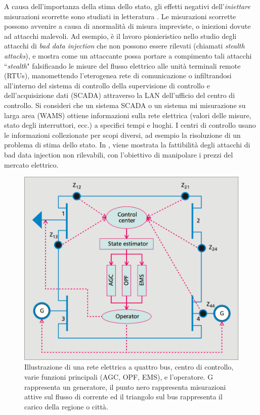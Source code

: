 A causa dell'importanza della stima dello stato, gli effetti negativi dell'\emph{iniettare} misurazioni scorrette sono studiati in letteratura \cite{baddatainj}.  Le misurazioni scorrette possono avvenire a causa di anormalità di misura impreviste, o iniezioni dovute ad attacchi malevoli. Ad esempio, \cite{falsedatainj} è il lavoro pionieristico nello studio degli attacchi di \emph{bad data injection} che non possono essere rilevati (chiamati \emph{stealth attacks}), e mostra come un attaccante possa portare a compimento tali attacchi ``\emph{stealth}" falsificando le misure del flusso elettrico alle unità terminali remote (RTUs), manomettendo l'eterogenea rete di comunicazione o infiltrandosi all'interno del sistema di controllo della supervisione di controllo e dell'acquisizione dati (SCADA) attraverso la LAN dell'ufficio del centro di controllo. Si consideri che un sistema SCADA o un sistema mi misurazione su larga area (WAMS) ottiene informazioni sulla rete elettrica (valori delle misure, stato degli interruttori, ecc.) a specifici tempi e luoghi. I centri di controllo usano le informazioni collezionate per scopi diversi, ad esempio la risoluzione di un problema di stima dello stato. In \cite{baddatainj2}, viene mostrata la fattibilità degli  attacchi di bad data injection non rilevabili, con l'obiettivo di manipolare i prezzi del mercato elettrico.
\begin{figure}[h]
	\centering
	\includegraphics[scale=.3]{imgs/attack/fourbuspowernet.png}
	\caption{Illustrazione di una rete elettrica a quattro bus, centro di controllo, varie funzioni principali (AGC, OPF, EMS), e l'operatore. G rappresenta un generatore, il punto nero rappresenta misurazioni attive sul flusso di corrente ed il triangolo sul bus rappresenta il carico della regione o città.}
	\label{fourbuspowernet_img}
\end{figure}

